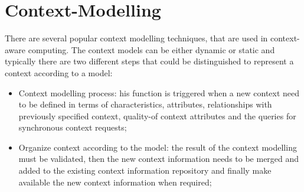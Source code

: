\documentclass{thesisreport}
\begin{document}
\section{Context-Modelling}
 There are several popular context modelling techniques, that are used in context-aware computing. The context models can be either dynamic or static and typically there are two different steps that could be distinguished to represent a context according to a model:
 \begin{itemize}
     \item Context modelling process: his function is triggered when a new context need to be defined in terms of characteristics, attributes, relationships with previously specified context, quality-of context attributes and the queries for synchronous context requests;
     \item Organize context according to the model: the result of the context modelling must be validated, then the new context information needs to be merged and added to the existing context information repository and finally make available the new context information when required;
 \end{itemize}
 
\end{document}
